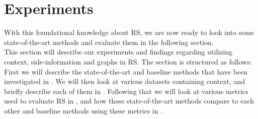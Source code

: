 \section{Experiments}\label{sec:experiments}
With this foundational knowledge about RS, we are now ready to look into some state-of-the-art methods and evaluate them in the following section.\\ 
This section will describe our experiments and findings regarding utilizing context, side-information and graphs in RS.
The section is structured as follows: First we will describe the state-of-the-art and baseline methods that have been investigated in .
We will then look at various datasets containing context, and briefly describe each of them in .
Following that we will look at various metrics used to evaluate RS in , and how these state-of-the-art methods compare to each other and baseline methods using these metrics in .





